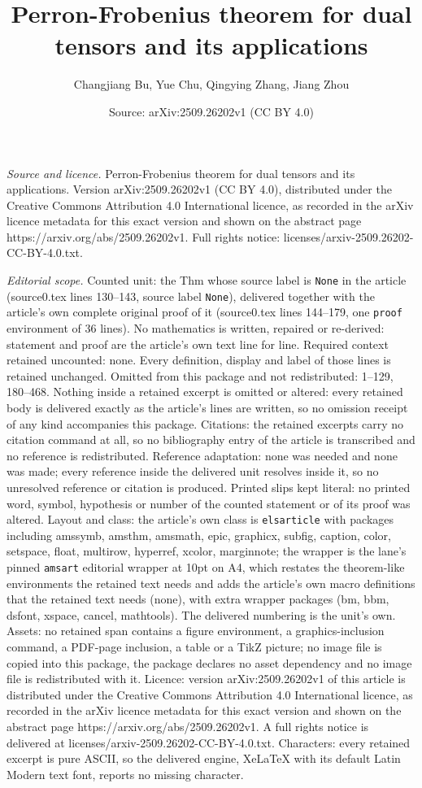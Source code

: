 \documentclass[10pt,a4paper]{amsart}
\title[Perron-Frobenius theorem for dual tensors and its applicatio]{Perron-Frobenius theorem for dual tensors and its applications}
\author{Changjiang Bu, Yue Chu, Qingying Zhang, Jiang Zhou}
\date{Source: arXiv:2509.26202v1 (CC BY 4.0)}
\begin{document}
\maketitle

\noindent\emph{Source and licence.} Perron-Frobenius theorem for dual tensors and its applications. Version arXiv:2509.26202v1 (CC BY 4.0), distributed under the Creative Commons Attribution 4.0 International licence, as recorded in the arXiv licence metadata for this exact version and shown on the abstract page https://arxiv.org/abs/2509.26202v1. Full rights notice: licenses/arxiv-2509.26202-CC-BY-4.0.txt.\par\smallskip

\noindent\textit{Editorial scope.} Counted unit: the Thm whose source label is \texttt{None} in the article (source0.tex lines 130--143, source label \texttt{None}), delivered together with the article's own complete original proof of it (source0.tex lines 144--179, one \texttt{proof} environment of 36 lines). No mathematics is written, repaired or re-derived: statement and proof are the article's own text line for line. Required context retained uncounted: none. Every definition, display and label of those lines is retained unchanged. Omitted from this package and not redistributed: 1--129, 180--468. Nothing inside a retained excerpt is omitted or altered: every retained body is delivered exactly as the article's lines are written, so no omission receipt of any kind accompanies this package. Citations: the retained excerpts carry no citation command at all, so no bibliography entry of the article is transcribed and no reference is redistributed. Reference adaptation: none was needed and none was made; every reference inside the delivered unit resolves inside it, so no unresolved reference or citation is produced. Printed slips kept literal: no printed word, symbol, hypothesis or number of the counted statement or of its proof was altered. Layout and class: the article's own class is \texttt{elsarticle} with packages including amssymb, amsthm, amsmath, epic, graphicx, subfig, caption, color, setspace, float, multirow, hyperref, xcolor, marginnote; the wrapper is the lane's pinned \texttt{amsart} editorial wrapper at 10pt on A4, which restates the theorem-like environments the retained text needs and adds the article's own macro definitions that the retained text needs (none), with extra wrapper packages (bm, bbm, dsfont, xspace, cancel, mathtools). The delivered numbering is the unit's own. Assets: no retained span contains a figure environment, a graphics-inclusion command, a PDF-page inclusion, a table or a TikZ picture; no image file is copied into this package, the package declares no asset dependency and no image file is redistributed with it. Licence: version arXiv:2509.26202v1 of this article is distributed under the Creative Commons Attribution 4.0 International licence, as recorded in the arXiv licence metadata for this exact version and shown on the abstract page https://arxiv.org/abs/2509.26202v1. A full rights notice is delivered at licenses/arxiv-2509.26202-CC-BY-4.0.txt. Characters: every retained excerpt is pure ASCII, so the delivered engine, XeLaTeX with its default Latin Modern text font, reports no missing character.
\end{document}
